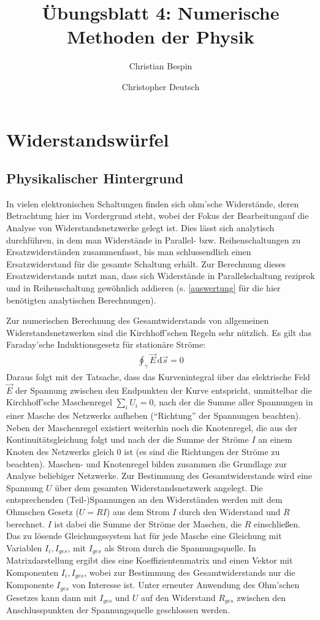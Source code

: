 \documentclass[10pt,a4paper]{article}
\author{Christian Bespin \and Christopher Deutsch}
\title{Übungsblatt 4: Numerische Methoden der Physik}
\begin{document}
\maketitle

\setcounter{section}{3}

\section{Widerstandswürfel}

\subsection{Physikalischer Hintergrund}

In vielen elektronischen Schaltungen finden sich ohm'sche Widerstände, deren Betrachtung hier im Vordergrund steht, wobei der Fokus der Bearbeitungauf die Analyse von Widerstandsnetzwerke gelegt ist. Dies lässt sich analytisch durchführen, in dem man Widerstände in Parallel- bzw. Reihenschaltungen zu Ersatzwiderständen zusammenfasst, bis man schlussendlich einen Ersatzwiderstand für die gesamte Schaltung erhält. Zur Berechnung dieses Ersatzwiderstands nutzt man, dass sich Widerstände in Parallelschaltung reziprok und in Reihenschaltung gewöhnlich addieren (s. \ref{auswertung} für die hier benötigten analytischen Berechnungen).

Zur numerischen Berechnung des Gesamtwiderstands von allgemeinen Widerstandsnetzwerken sind die Kirchhoff'schen Regeln sehr nützlich. Es gilt das Faraday'sche Induktionsgesetz für stationäre Ströme:
\begin{align}
\oint_{\gamma} \vec{E}\,\mathrm{d}\vec{s} = 0
\end{align}
Daraus folgt mit der Tatsache, dass das Kurvenintegral über das elektrische Feld $\vec{E}$ der Spannung zwischen den Endpunkten der Kurve entspricht, unmittelbar die Kirchhoff'sche Maschenregel $\sum_i U_i=0$, nach der die Summe aller Spannungen in einer Masche des Netzwerks aufheben ("`Richtung"' der Spannungen beachten).
Neben der Maschenregel existiert weiterhin noch die Knotenregel, die aus der Kontinuitätsgleichung folgt und nach der die Summe der Ströme $I$ an einem Knoten des Netzwerks gleich $0$ ist (es sind die Richtungen der Ströme zu beachten). Maschen- und Knotenregel bilden zusammen die Grundlage zur Analyse beliebiger Netzwerke.
Zur Bestimmung des Gesamtwiderstands wird eine Spannung $U$ über dem gesamten Widerstandsnetzwerk angelegt. Die entsprechenden (Teil-)Spannungen an den Widerständen werden mit dem Ohmschen Gesetz ($U=R I$) aus dem Strom $I$ durch den Widerstand und $R$ berechnet. $I$ ist dabei die Summe der Ströme der Maschen, die $R$ einschließen. Das zu lösende Gleichungssystem hat für jede Masche eine Gleichung mit Variablen $I_i, I_{ges}$, mit $I_{ges}$ als Strom durch die Spannungsquelle. In Matrixdarstellung ergibt dies eine Koeffizientenmatrix und einen Vektor mit Komponenten $I_i, I_{ges}$, wobei zur Bestimmung des Gesamtwiderstands nur die Komponente $I_{ges}$ von Interesse ist. Unter erneuter Anwendung des Ohm'schen Gesetzes kann dann mit $I_{ges}$ und $U$ auf den Widerstand $R_{ges}$ zwischen den Anschlusspunkten der Spannungsquelle geschlossen werden.
\end{document}
